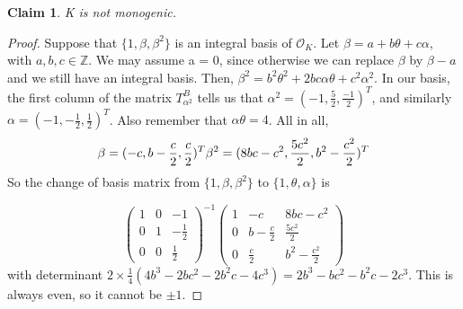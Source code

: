 \documentclass[11pt]{article}
\newtheorem{claim}[theorem]{Claim}
\theoremstyle{definition}
\begin{document}
    \begin{claim}
        K is not monogenic.
    \end{claim}
    \begin{proof}
        Suppose that $\{1, \beta, \beta^2\}$ is an integral basis of $\mathcal{O}_K$.
        Let $\beta=a+b\theta+c\alpha$, with $a,b,c \in \mathbb{Z}$.
        We may assume a = 0, since otherwise we can replace $\beta$ by $\beta - a$
        and we still have an integral basis.
        Then, $\beta^2 = b^2\theta^2+2bc\alpha\theta+c^2\alpha^2$.
        In our basis, the first column of the matrix $T_{\alpha^2}^B$ tells us that
        $\alpha^2 = (-1, \frac{5}{2}, \frac{-1}{2})^T$, and similarly
        $\alpha = (-1, -\frac{1}{2}, \frac{1}{2})^T$.
        Also remember that $\alpha\theta=4$.
        All in all,
        \[
            \beta = (-c,b-\frac{c}{2},\frac{c}{2})^T \\
            \beta^2 = (8bc-c^2, \frac{5c^2}{2}, b^2 - \frac{c^2}{2})^T

        \]
        So the change of basis matrix from $\{1, \beta, \beta^2\}$ to $\{1, \theta, \alpha\}$  is

        \[
            \begin{pmatrix}
                1 & 0 & -1 \\
                0 & 1 & -\frac{1}{2} \\
                0 & 0 & \frac{1}{2}
            \end{pmatrix}^{-1}
            \begin{pmatrix}
                1 & -c& 8bc-c^2 \\
                0 & b-\frac{c}{2} & \frac{5c^2}{2} \\
                0 & \frac{c}{2} & b^2 - \frac{c^2}{2}
            \end{pmatrix}

        \]
        with determinant $2 \times \frac{1}{4} (4b^3- 2bc^2 - 2b^2c -4c^3)
        = 2b^3-bc^2-b^2c-2c^3$.
        This is always even, so it cannot be $\pm 1$.
    \end{proof}
\end{document}
